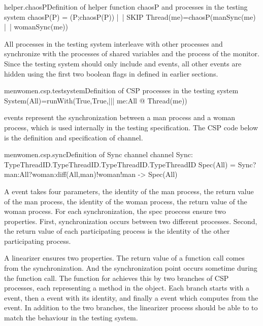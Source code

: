 \documentclass[a4paper, 12pt]{article}
\begin{document}
\begin{cspinline}{helper.chaosP}{Definition of helper function chaosP and processes in the testing system}
chaosP(P) = (P;chaosP(P)) |~| SKIP
Thread(me)=chaosP(manSync(me) |~| womanSync(me))
\end{cspinline}
  
All processes in the testing system interleave with other processes and synchronize with the processes of shared variables and the process of the monitor. Since the testing system should only include  and  events, all other events are hidden using the first two boolean flags in  defined in earlier sections. 

\begin{cspinline}{menwomen.csp.testsystem}{Definition of CSP processes in the testing system}
System(All)=runWith(True,True,||| me:All @ Thread(me))
\end{cspinline}

 events represent the synchronization between a man process and a woman process, which is used internally in the testing specification. The CSP code below is the definition and specification of  channel. 

\begin{cspinline}{menwomen.csp.sync}{Definition of Sync channel}
  channel Sync: TypeThreadID.TypeThreadID.TypeThreadID.TypeThreadID
  Spec(All) = Sync?man:All?woman:diff(All,{man})!woman!man -> Spec(All)
\end{cspinline}
  
A  event takes four parameters, the identity of the man process, the return value of the man process, the identity of the woman process, the return value of the woman process. For each synchronization, the spec proecess ensure two properties. First, synchronization occurs between two different processes. Second, the return value of each participating process is the identity of the other participating process. 


A linearizer ensures two properties. The return value of a function call comes from the synchronization. And the synchronization point occurs sometime during the function call. The  function for  achieves this by two branches of CSP processes, each representing a method in the object. Each branch starts with a  event, then a  event with its identity, and finally a  event which computes from the  event. In addition to the two branches, the linearizer process should be able to  to match the behaviour in the testing system.
\end{document}
